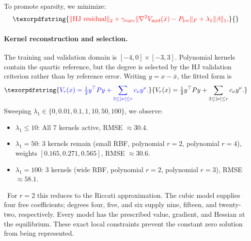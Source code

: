 \documentclass[11pt]{article}
\theoremstyle{plain}      %
\theoremstyle{definition} %
\providecommand{\DIFaddtex}[1]{{\protect\color{blue}#1}} %
\providecommand{\DIFdeltex}[1]{{\protect\color{red}#1}} %
\providecommand{\DIFaddbegin}{} %
\providecommand{\DIFaddend}{} %
\providecommand{\DIFdelbegin}{} %
\providecommand{\DIFdelend}{} %
\providecommand{\DIFadd}[1]{\texorpdfstring{\DIFaddtex{#1}}{#1}} %
\providecommand{\DIFdel}[1]{\texorpdfstring{\DIFdeltex{#1}}{}} %
\newcommand{\DIFscaledelfig}{1.0}
\newlength{\DIFdelgraphicswidth} %
\newlength{\DIFdelgraphicsheight} %
\newcommand{\DIFaddincludegraphics}[2][]{{\color{blue}\fbox{\DIFOincludegraphics[#1]{#2}}}} %
\newcommand{\DIFdelincludegraphics}[2][]{%
\sbox{\DIFdelgraphicsbox}{\DIFOincludegraphics[#1]{#2}}%
\settoboxwidth{\DIFdelgraphicswidth}{\DIFdelgraphicsbox} %
\settoboxtotalheight{\DIFdelgraphicsheight}{\DIFdelgraphicsbox} %
\scalebox{\DIFscaledelfig}{%
\parbox[b]{\DIFdelgraphicswidth}{\usebox{\DIFdelgraphicsbox}\\[-\baselineskip] \rule{\DIFdelgraphicswidth}{0em}}\llap{\resizebox{\DIFdelgraphicswidth}{\DIFdelgraphicsheight}{%
\setlength{\unitlength}{\DIFdelgraphicswidth}%
\begin{picture}(1,1)%
\thicklines\linethickness{2pt} %
{\color[rgb]{1,0,0}\put(0,0){\framebox(1,1){}}}%
{\color[rgb]{1,0,0}\put(0,0){\line( 1,1){1}}}%
{\color[rgb]{1,0,0}\put(0,1){\line(1,-1){1}}}%
\end{picture}%
}\hspace*{3pt}}} %
} %
\DeclareRobustCommand{\DIFaddbegin}{\DIFOaddbegin \let\includegraphics\DIFaddincludegraphics} %
\DeclareRobustCommand{\DIFaddend}{\DIFOaddend \let\includegraphics\DIFOincludegraphics} %
\DeclareRobustCommand{\DIFdelbegin}{\DIFOdelbegin \let\includegraphics\DIFdelincludegraphics} %
\DeclareRobustCommand{\DIFdelend}{\DIFOaddend \let\includegraphics\DIFOincludegraphics} %
\begin{document}
\DIFdelbegin \DIFdel{To promote sparsity, we minimize:
}\[
\DIFdel{\|\text{HJ residual}\|_2 + \gamma_{\text{curv}} \|\nabla^2 V_{\text{mid}}(\bar{x}) - P_{\mathrm{loc}}\|_F + \lambda_1 \|\beta\|_1,
}\]%
\DIFdelend \DIFaddbegin \paragraph{\DIFadd{Kernel reconstruction and selection.}}
\DIFadd{The training and validation domain is $[-4,0]\times[-3,3]$. Polynomial kernels contain the quartic reference, but the degree is selected by the HJ validation criterion rather than by reference error. Writing $y=x-\bar x$, the fitted form is
}\[
 \DIFadd{V_r(x)=\tfrac12y^\top Py+\sum_{3\leq|\nu|\leq r}c_\nu y^\nu.
}\]\DIFaddend 
\DIFdelbegin \DIFdel{Sweeping \( \lambda_1 \in \{0, 0.01, 0.1, 1, 10, 50, 100\} \), we observe:
}%
\begin{itemize}%
\item%
\DIFdel{\( \lambda_1 \le 10 \): All 7 kernels active, RMSE \( \approx 30.4 \). }%
\item%
\DIFdel{\( \lambda_1 = 50 \): 3 kernels remain (small RBF, polynomial \( r = 2 \), polynomial \( r = 4 \)), weights \( [0.165, 0.271, 0.565] \), RMSE \( \approx 30.6 \). }%
\item%
\DIFdel{\( \lambda_1 = 100 \): 3 kernels (wide RBF, polynomial \( r = 2 \), polynomial \( r = 3 \)), RMSE \( \approx 58.1 \).
}
\end{itemize}%
\DIFdelend\ \DIFaddbegin \DIFadd{For $r=2$ this reduces to the Riccati approximation. The cubic model supplies four free coefficients; degrees four, five, and six supply nine, fifteen, and twenty-two, respectively. Every model has the prescribed value, gradient, and Hessian at the equilibrium. These exact local constraints prevent the constant zero solution from being represented.
}\DIFaddend 
\end{document}
